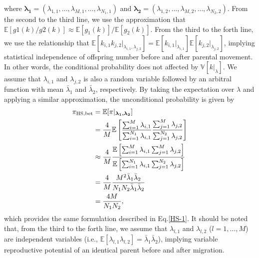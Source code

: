\documentclass[12pt, English]{article}
\begin{document}
\begin{spacing}{1.9}
where $\boldsymbol{\lambda_1}=(\lambda_{1,1}, \ldots, \lambda_{M,1}, \ldots, \lambda_{N_1,1})$ and $\boldsymbol{\lambda_2}=(\lambda_{1,2}, \ldots, \lambda_{M,2}, \ldots, \lambda_{N_2,2})$. From the second to the third line, we use the approximation that $\mathbb{E}[g1(k)/g2(k)] \approx \mathbb{E}[g_1(k)] / \mathbb{E}[g_2(k)]$. From the third to the forth line, we use the relationship that $\mathbb{E}[k_{i,1}k_{j,2} | _{\lambda_{i,1}, \lambda_{j,2}}] = \mathbb{E}[k_{i,1}|_{\lambda_{i,1}}]\mathbb{E}[k_{j,2}|_{\lambda_{j,2}}]$, implying statistical independence of offspring number before and after parental movement. In other words, the conditional probability does not affected by $\mathbb{V}[k|_\lambda]$. We assume that $\lambda_{i,1}$ and $\lambda_{j,2}$ is also a random variable followed by an arbitral function with mean ${\bar \lambda_{1}}$ and ${\bar \lambda_{2}}$, respectively. By taking the expectation over $\lambda$ and applying a similar approximation, the unconditional probability is given by
\begin{align}
\pi_{\rm HS,bet} &= \mathbb{E}[\pi | _{\boldsymbol{\lambda_1, \lambda_2}}] \nonumber\\ 
&= \frac{4}{M} \mathbb{E}\left[\frac{ \sum_{i=1}^M \lambda_{i,1} } { \sum_{i=1}^{N_1} \lambda_{i,1} } \frac{ \sum_{j=1}^M \lambda_{j,2} } { \sum_{j=1}^{N_2} \lambda_{j,2} } \right]   \nonumber\\
&\approx \frac{4}{M} \frac{ \mathbb{E}\left[ \sum_{i=1}^M \lambda_{i,1} \sum_{j=1}^M \lambda_{j,2} \right] } {\mathbb{E}\left[ \sum_{i=1}^{N_1} \lambda_{i,1} \sum_{j=1}^{N_2} \lambda_{j,2}\right]} \nonumber\\
&= \frac{4}{M} \frac{M^2 {\bar \lambda_1} {\bar \lambda_2}}{N_1 N_2 {\bar \lambda_1} {\bar \lambda_2}}\nonumber\\
&= \frac{4M}{N_{1}N_{2}},
\label{App2}
\end{align}
which provides the same formulation described in Eq.\ref{HS-1}. It should be noted that, from the third to the forth line, we assume that $\lambda_{l,1}$ and $\lambda_{l,2}$ ($l = 1, \ldots, M$) are independent variables (i.e., $\mathbb{E}[\lambda_{l,1}\lambda_{l,2}] = {\bar \lambda_{1}}{\bar \lambda_{2}}$), implying variable reproductive potential of an identical parent before and after migration. 


\end{spacing}
\end{document}
